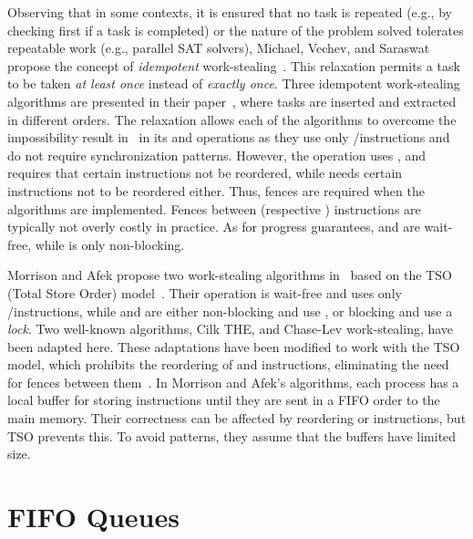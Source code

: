 Observing that in some contexts, it is ensured that no task is repeated (e.g., by checking first if a task is completed) or the nature of the problem solved tolerates repeatable work (e.g., parallel SAT solvers), Michael, Vechev, and Saraswat propose the concept of \emph{idempotent} work-stealing~\cite{maged.vechev.2009}. This relaxation permits a task to be taken \emph{at least once} instead of \emph{exactly once}. Three idempotent work-stealing algorithms are presented in their paper~\cite{maged.vechev.2009},  where tasks are inserted and extracted in different orders. The relaxation allows each of the algorithms to overcome the impossibility result in~\cite{DBLP_conf_popl_AttiyaGHKMV11} in its \Put{} and \Take{} operations as they use only \R/\W instructions and do not require \RAW{} synchronization patterns. However, the \Steal{} operation uses \CAS, and \Put{} requires that certain \W instructions not be reordered, while \Steal{} needs certain \R instructions not to be reordered either. Thus, fences are required when the algorithms are implemented. Fences between \R (respective \W) instructions are typically not overly costly in practice. As for progress guarantees, \Put{} and \Take{} are wait-free, while \Steal{} is only non-blocking.

Morrison and Afek propose two work-stealing algorithms in~\cite{fencefreeworkproceedings} based on the TSO (Total Store Order) model~\cite{DBLP_journals_cacm_SewellSONM10}. Their \Put{} operation is wait-free and uses only \R/\W instructions, while \Take{} and \Steal{} are either non-blocking and use \CAS, or blocking and use a \emph{lock}. Two well-known algorithms, Cilk THE, and Chase-Lev work-stealing, have been adapted here. These adaptations have been modified to work with the TSO model, which prohibits the reordering of \W and \R instructions, eliminating the need for fences between them~\cite{circular.work.stealing, DBLP_conf_pldi_FrigoLR98}. In Morrison and Afek's algorithms, each process has a local buffer for storing \W instructions until they are sent in a FIFO order to the main memory. Their correctness can be affected by reordering \W or \R instructions, but TSO prevents this. To avoid \RAW{} patterns, they assume that the \W buffers have limited size.


\section{\label{section:FIFO-queues}FIFO Queues}

